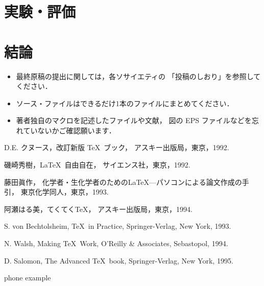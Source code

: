 \documentclass[paper]{ieicej}
\newcommand{\AmSLaTeX}{%
 $\mathcal A$\lower.4ex\hbox{$\!\mathcal M\!$}$\mathcal S$-\LaTeX}
\begin{document}
\section{実験・評価}
\label{sec:experiments}

\section{結論}
\label{sec:conclusion}

\begin{itemize}
\item
最終原稿の提出に関しては，各ソサイエティの
「投稿のしおり」を参照してください．
\item
ソース・ファイルはできるだけ1本のファイルにまとめてください．
\item
著者独自のマクロを記述したファイルや文献，
図の EPS ファイルなどを忘れていないかご確認願います．
\end{itemize}

\begin{thebibliography}{99}





D.E. クヌース，改訂新版 \TeX\ ブック，
アスキー出版局，東京，1992.

磯崎秀樹，\LaTeX\ 自由自在，
サイエンス社，東京，1992.



藤田眞作，
化学者・生化学者のための\LaTeX---パソコンによる論文作成の手引，
東京化学同人，東京，1993.


阿瀬はる美，てくてく\TeX{}，
アスキー出版局，東京，1994.

S. von Bechtolsheim, \TeX\ in Practice,
Springer-Verlag, New York, 1993.

N. Walsh, Making \TeX\ Work,
O'Reilly \& Associates, Sebastopol, 1994.

D. Salomon, The Advanced \TeX\ book,
Springer-Verlag, New York, 1995.

phone example

\end{thebibliography}
\end{document}
